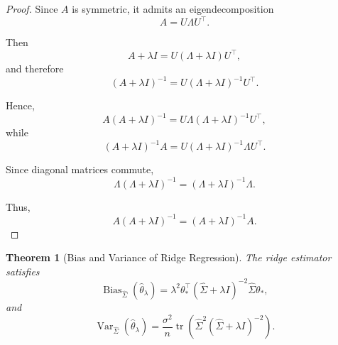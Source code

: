 \documentclass[12pt,oneside]{book}
\numberwithin{equation}{section}
\theoremstyle{definition}
\theoremstyle{plain}
\newtheorem{theorem}{Theorem}[section]
\theoremstyle{remark}
\newcommand{\tr}{\operatorname{tr}}
\begin{document}
\begin{proof}
Since $A$ is symmetric, it admits an eigendecomposition
\[
A=U\Lambda U^\top.
\]

Then
\[
A+\lambda I
=
U(\Lambda+\lambda I)U^\top,
\]
and therefore
\[
(A+\lambda I)^{-1}
=
U(\Lambda+\lambda I)^{-1}U^\top.
\]

Hence,
\[
A(A+\lambda I)^{-1}
=
U\Lambda(\Lambda+\lambda I)^{-1}U^\top,
\]
while
\[
(A+\lambda I)^{-1}A
=
U(\Lambda+\lambda I)^{-1}\Lambda U^\top.
\]

Since diagonal matrices commute,
\[
\Lambda(\Lambda+\lambda I)^{-1}
=
(\Lambda+\lambda I)^{-1}\Lambda.
\]

Thus,
\[
A(A+\lambda I)^{-1}
=
(A+\lambda I)^{-1}A.
\]
\end{proof}

\begin{theorem}[Bias and Variance of Ridge Regression]
The ridge estimator satisfies
\[
\operatorname{Bias}_{\widehat{\Sigma}}(\widehat{\theta}_\lambda)
=
\lambda^2
\theta_*^\top
(\widehat{\Sigma}+\lambda I)^{-2}
\widehat{\Sigma}
\theta_*,
\]
and
\[
\operatorname{Var}_{\widehat{\Sigma}}(\widehat{\theta}_\lambda)
=
\frac{\sigma^2}{n}
\tr\left(
\widehat{\Sigma}^2
(\widehat{\Sigma}+\lambda I)^{-2}
\right).
\]
\end{theorem}
\end{document}
